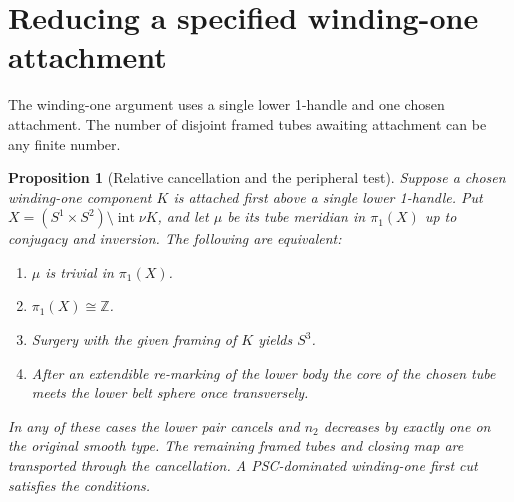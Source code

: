 \documentclass[11pt,letterpaper]{article}
\numberwithin{equation}{section}
\newtheorem{proposition}[theorem]{Proposition}
\theoremstyle{remark}
\DeclareMathOperator{\intt}{int}
\begin{document}
\section{Reducing a specified winding-one attachment}\label{sec:reduction}
The winding-one argument uses a single lower 1-handle and
one chosen attachment. The number of disjoint framed tubes
awaiting attachment can be any finite number.

\begin{proposition}[Relative cancellation and the peripheral test]\label{prop:peripheral}
Suppose a chosen winding-one component \(K\) is attached first
above a single lower 1-handle. Put
\(X=(S^1\times S^2)\setminus\intt\nu K\), and let \(\mu\)
be its tube meridian in \(\pi_1(X)\) up to conjugacy and inversion.
The following are equivalent:
\begin{enumerate}
 \item \(\mu\) is trivial in \(\pi_1(X)\).
 \item \(\pi_1(X)\cong\mathbb Z\).
 \item Surgery with the given framing of \(K\) yields \(S^3\).
 \item After an extendible re-marking of the lower body the core
       of the chosen tube meets the lower belt sphere once
       transversely.
\end{enumerate}
In any of these cases the lower pair cancels and \(n_2\) decreases
by exactly one on the original smooth type. The remaining framed
tubes and closing map are transported through the cancellation.
A PSC-dominated winding-one first cut satisfies the conditions.
\end{proposition}
\end{document}
